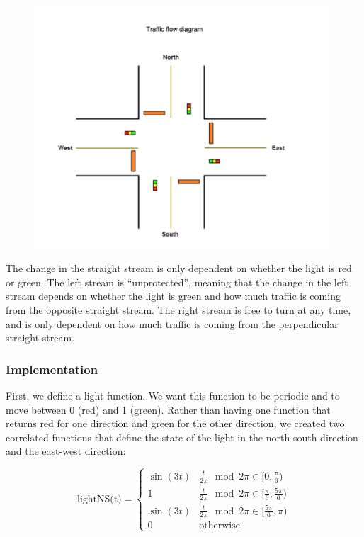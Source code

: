 \documentclass[12pt]{article}
\begin{document}
\begin{figure}[htp]
    \centering
    \includegraphics[width=11cm]{figures/TrafficDiagrampng.png}
    \label{fig:diagram}
\end{figure}

The change in the straight stream is only dependent on whether the light is red or green. The left stream is “unprotected”, meaning that the change in the left stream depends on whether the light is green and how much traffic is coming from the opposite straight stream. The right stream is free to turn at any time, and is only dependent on how much traffic is coming from the perpendicular straight stream.

\subsubsection{Implementation}

First, we define a light function. We want this function to be periodic and to move between 0 (red) and 1 (green). Rather than having one function that returns red for one direction and green for the other direction, we created two correlated functions that define the state of the light in the north-south direction and the east-west direction:

\[
\textrm{lightNS(t)} =
\begin{cases} 
    \sin(3t) & \frac{t}{ 2\pi} \mod 2 \pi\in [0, \frac{\pi}{6}) \\
    1 & \frac{t}{ 2\pi} \mod 2 \pi\in [\frac{\pi}{6},\frac{5\pi}{6}) \\
    \sin(3t) & \frac{t}{ 2\pi} \mod 2 \pi\in [\frac{5\pi}{6}, \pi) \\
    0 & \text{otherwise}
\end{cases}
\]
\end{document}
